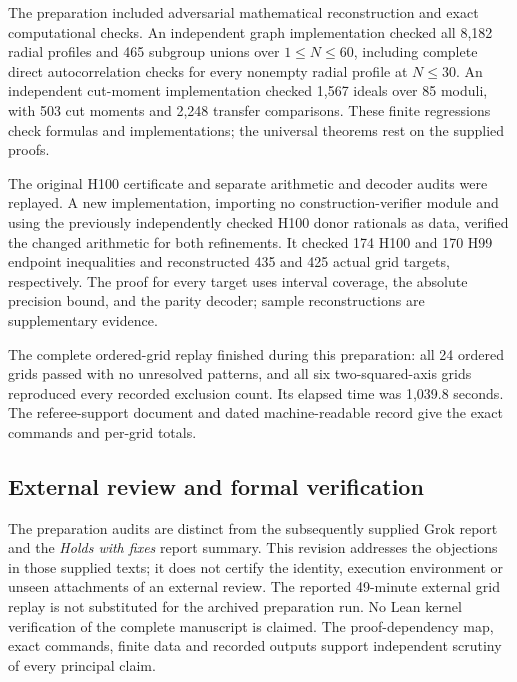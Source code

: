 \documentclass[10pt]{article}
\begin{document}
The preparation included adversarial mathematical reconstruction and exact computational checks. An independent graph implementation checked all 8,182 radial profiles and 465 subgroup unions over $1\leq N\leq60$, including complete direct autocorrelation checks for every nonempty radial profile at $N\leq30$. An independent cut-moment implementation checked 1,567 ideals over 85 moduli, with 503 cut moments and 2,248 transfer comparisons. These finite regressions check formulas and implementations; the universal theorems rest on the supplied proofs.

The original H100 certificate and separate arithmetic and decoder audits were replayed. A new implementation, importing no construction-verifier module and using the previously independently checked H100 donor rationals as data, verified the changed arithmetic for both refinements. It checked 174 H100 and 170 H99 endpoint inequalities and reconstructed 435 and 425 actual grid targets, respectively. The proof for every target uses interval coverage, the absolute precision bound, and the parity decoder; sample reconstructions are supplementary evidence.

The complete ordered-grid replay finished during this preparation: all 24 ordered grids passed with no unresolved patterns, and all six two-squared-axis grids reproduced every recorded exclusion count. Its elapsed time was 1,039.8 seconds. The referee-support document and dated machine-readable record give the exact commands and per-grid totals.

\subsection*{External review and formal verification}

The preparation audits are distinct from the subsequently supplied Grok
report and the \textit{Holds with fixes} report summary. This revision
addresses the objections in those supplied texts; it does not certify the
identity, execution environment or unseen attachments of an external
review. The reported 49-minute external grid replay is not substituted
for the archived preparation run. No Lean kernel verification of the
complete manuscript is claimed. The proof-dependency map, exact commands,
finite data and recorded outputs support independent scrutiny of every
principal claim.
\end{document}
